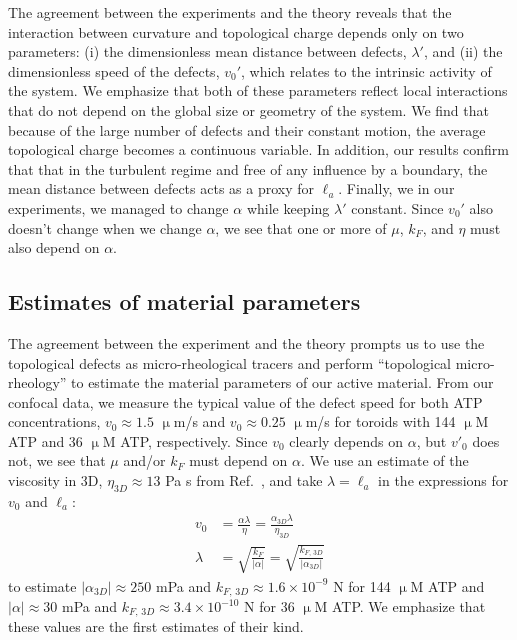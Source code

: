 The agreement between the experiments and the theory reveals that the interaction between curvature and topological charge depends only on two parameters: (i) the dimensionless mean distance between defects, $\lambda'$, and (ii) the dimensionless speed of the defects, $v_0'$, which relates to the intrinsic activity of the system.
We emphasize that both of these parameters reflect local interactions that do not depend on the global size or geometry of the system.
We find that because of the large number of defects and their constant motion, the average topological charge becomes a continuous variable.
In addition, our results confirm that that in the turbulent regime and free of any influence by a boundary, the mean distance between defects acts as a
proxy for $\ell_a$.
Finally, we in our experiments, we managed to change $\alpha$ while keeping $\lambda'$ constant.
Since $v_0'$ also doesn't change when we change $\alpha$, we see that one or more of $\mu$, $k_F$, and $\eta$ must also depend on $\alpha$.


\subsection{Estimates of material parameters}
The agreement between the experiment and the theory prompts us to use the topological defects as micro-rheological tracers and perform “topological micro-rheology” to estimate the material parameters of our active material.
From our confocal data, we measure the typical value of the defect speed for both ATP concentrations, $v_0 \approx 1.5$ $\upmu$m/s and $v_0 \approx 0.25$ $\upmu$m/s for toroids with 144 $\upmu$M ATP and 36 $\upmu$M ATP, respectively.
Since $v_0$ clearly depends on $\alpha$, but $v'_0$ does not, we see that $\mu$ and/or $k_F$ must depend on $\alpha$.
We use an estimate of the viscosity in 3D, $\eta_{3D} \approx 13$ Pa s from Ref.~\cite{RN135, activeViscosity}, and take $\lambda = \ell_a$ in the expressions for $v_0$ and $\ell_a$:
\begin{align}
  v_0 &= \frac{\alpha \lambda}{\eta} = \frac{\alpha_{3D} \lambda}{\eta_{3D}} \\
  \lambda &  = \sqrt{\frac{k_F}{|\alpha|}} = \sqrt{\frac{k_{F,\,3D}}{|\alpha_{3D}|}}
\end{align}
 to estimate $|\alpha_{3D}| \approx  250$ mPa and $k_{F,\, 3D} \approx 1.6 \times 10^{-9}$ N for 144 $\upmu$M ATP and $|\alpha| \approx  30$ mPa and $k_{F,\, 3D} \approx 3.4 \times 10^{-10}$ N for 36 $\upmu$M ATP.
We emphasize that these values are the first estimates of their kind.

